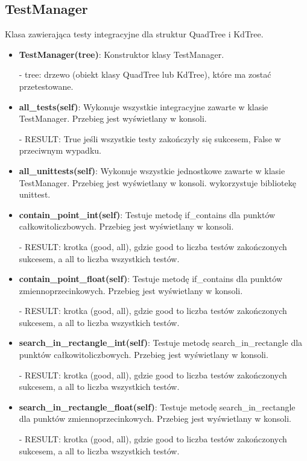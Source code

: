 \documentclass{lab}
\begin{document}
\subsection{TestManager}
Klasa zawierająca testy integracyjne dla struktur QuadTree i KdTree.
\begin{itemize}
  \item \textbf{TestManager(tree)}:
  Konstruktor klasy TestManager.

  - tree: drzewo (obiekt klasy QuadTree lub KdTree), które ma zostać przetestowane.

  \item \textbf{all\_tests(self)}:
  Wykonuje wszystkie integracyjne zawarte w klasie TestManager. Przebieg jest wyświetlany w konsoli.

  - RESULT: True jeśli wszystkie testy zakończyły się sukcesem, False w przeciwnym wypadku.

  \item \textbf{all\_unittests(self)}:
  Wykonuje wszystkie jednostkowe zawarte w klasie TestManager. Przebieg jest wyświetlany w konsoli.
  wykorzystuje bibliotekę unittest.

  \item \textbf{contain\_point\_int(self)}:
  Testuje metodę if\_contains dla punktów całkowitoliczbowych. Przebieg jest wyświetlany w konsoli.

  - RESULT: krotka (good, all), gdzie good to liczba testów zakończonych sukcesem, a all to liczba wszystkich testów.

  \item \textbf{contain\_point\_float(self)}:
  Testuje metodę if\_contains dla punktów zmiennoprzecinkowych. Przebieg jest wyświetlany w konsoli.

  - RESULT: krotka (good, all), gdzie good to liczba testów zakończonych sukcesem, a all to liczba wszystkich testów.

  \item \textbf{search\_in\_rectangle\_int(self)}:
  Testuje metodę search\_in\_rectangle dla punktów całkowitoliczbowych. Przebieg jest wyświetlany w konsoli.

  - RESULT: krotka (good, all), gdzie good to liczba testów zakończonych sukcesem, a all to liczba wszystkich testów.

  \item \textbf{search\_in\_rectangle\_float(self)}:
  Testuje metodę search\_in\_rectangle dla punktów zmiennoprzecinkowych. Przebieg jest wyświetlany w konsoli.

  - RESULT: krotka (good, all), gdzie good to liczba testów zakończonych sukcesem, a all to liczba wszystkich testów.
\end{itemize}
\end{document}
